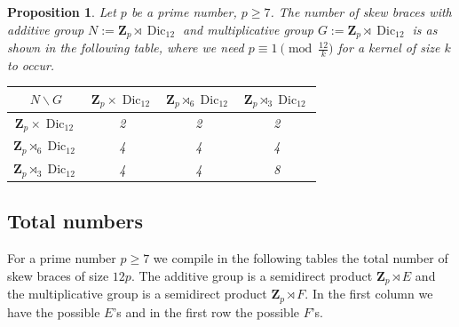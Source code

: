\documentclass[12pt]{article}
\newtheorem{proposition}[theorem]{Proposition}
\theoremstyle{definition}
\newcommand{\Z}{\mathbf Z}
\newcommand{\Dic}{\operatorname{Dic}}
\begin{document}
\begin{proposition}
	Let $p$ be a prime number, $p\geq 7$.
	The number of skew braces with additive group $N:=\Z_p \rtimes \Dic_{12}$ and multiplicative group $G:=\Z_p\rtimes \Dic_{12}$ is as shown in the following table, where we need $p\equiv 1 \pmod{\frac {12}k}$ for a kernel of size $k$ to occur.
	
	\begin{center}
		\begin{tabular}{|c||c|c|c|}
			\hline
			$N \backslash G$ & $\Z_p\times \Dic_{12}$ & $\Z_p\rtimes_{6} \Dic_{12}$ & $\Z_p\rtimes_{3} \Dic_{12}$  \\
			\hline
			\hline
			$\Z_p\times \Dic_{12}$ &2&2&2\\
			\hline
			$\Z_p\rtimes_{6} \Dic_{12}$ &4&4&4\\
			\hline
			$\Z_p\rtimes_{3} \Dic_{12}$ &4&4&8\\
			\hline
			
		\end{tabular}
	\end{center}
\end{proposition}









\subsection{Total numbers}

For a prime number $p\geq 7$ we compile in the following tables the total number of skew braces of size $12p$. The additive group is a semidirect product $\Z_p\rtimes E$ and the multiplicative group is a semidirect product $\Z_p\rtimes F$.
In the first column we have the possible $E$'s and in the first row the possible $F$'s.
\end{document}
